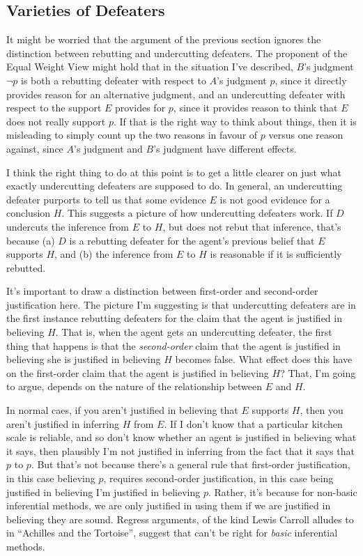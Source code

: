 \subsection{Varieties of Defeaters}

\noindent It might be worried that the argument of the previous section ignores the distinction between rebutting and undercutting defeaters. The proponent of the Equal Weight View might hold that in the situation I've described, \(B\)'s judgment \(\neg p\) is both a rebutting defeater with respect to \(A\)'s judgment \(p\), since it directly provides reason for an alternative judgment, and an undercutting defeater with respect to the support \(E\) provides for \(p\), since it provides reason to think that \(E\) does not really support \(p\). If that is the right way to think about things, then it is misleading to simply count up the two reasons in favour of \(p\) versus one reason against, since \(A\)'s judgment and \(B\)'s judgment have different effects.

I think the right thing to do at this point is to get a little clearer on just what exactly undercutting defeaters are supposed to do. In general, an undercutting defeater purports to tell us that some evidence \(E\) is not good evidence for a conclusion \(H\). This suggests a picture of how undercutting defeaters work. If \(D\) undercuts the inference from \(E\) to \(H\), but does not rebut that inference, that's because (a) \(D\) is a rebutting defeater for the agent's previous belief that \(E\) supports \(H\), and (b) the inference from \(E\) to \(H\) is reasonable if it is sufficiently rebutted.

It's important to draw a distinction between first-order and second-order justification here. The picture I'm suggesting is that undercutting defeaters are in the first instance rebutting defeaters for the claim that the agent is justified in believing \(H\). That is, when the agent gets an undercutting defeater, the first thing that happens is that the \textit{second-order} claim that the agent is justified in believing she is justified in believing \(H\) becomes false. What effect does this have on the first-order claim that the agent is justified in believing \(H\)? That, I'm going to argue, depends on the nature of the relationship between \(E\) and \(H\).

In normal caes, if you aren't justified in believing that \(E\) supports \(H\), then you aren't justified in inferring \(H\) from \(E\). If I don't know that a particular kitchen scale is reliable, and so don't know whether an agent is justified in believing what it says, then plausibly I'm not justified in inferring from the fact that it says that \(p\) to \(p\). But that's not because there's a general rule that first-order justification, in this case believing \(p\), requires second-order justification, in this case being justified in believing I'm justified in believing \(p\). Rather, it's because for non-basic inferential methods, we are only justified in using them if we are justified in believing they are sound. Regress arguments, of the kind Lewis Carroll alludes to in ``Achilles and the Tortoise'', suggest that can't be right for \textit{basic} inferential methods. 


